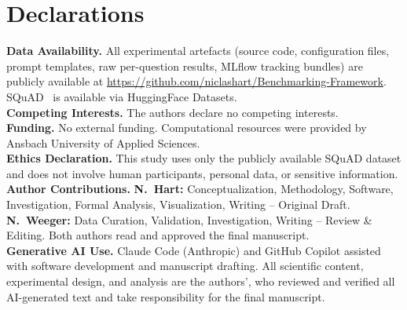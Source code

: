 \section*{Declarations}

\noindent\textbf{Data Availability.} All experimental artefacts (source code, configuration files, prompt templates, raw per-question results, MLflow tracking bundles) are publicly available at \url{https://github.com/niclashart/Benchmarking-Framework}. SQuAD~\cite{rajpurkar2016squad} is available via HuggingFace Datasets.\\[3pt]
\noindent\textbf{Competing Interests.} The authors declare no competing interests.\\[3pt]
\noindent\textbf{Funding.} No external funding. Computational resources were provided by Ansbach University of Applied Sciences.\\[3pt]
\noindent\textbf{Ethics Declaration.} This study uses only the publicly available SQuAD dataset and does not involve human participants, personal data, or sensitive information.\\[3pt]
\noindent\textbf{Author Contributions.} \textbf{N.~Hart:} Conceptualization, Methodology, Software, Investigation, Formal Analysis, Visualization, Writing -- Original Draft. \textbf{N.~Weeger:} Data Curation, Validation, Investigation, Writing -- Review \& Editing. Both authors read and approved the final manuscript.\\[3pt]
\noindent\textbf{Generative AI Use.} Claude Code (Anthropic) and GitHub Copilot assisted with software development and manuscript drafting. All scientific content, experimental design, and analysis are the authors', who reviewed and verified all AI-generated text and take responsibility for the final manuscript.
